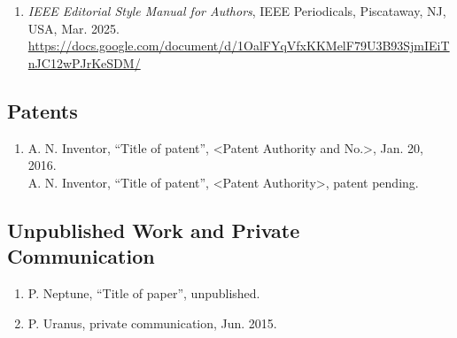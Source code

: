 \documentclass[%
               hyphens,       %
               ]{jacow}
\begin{document}
\begin{enumerate}[leftmargin=22pt, resume*]
	\item \textit{IEEE Editorial Style Manual for Authors},
		IEEE Periodicals, Piscataway,
		NJ, USA, Mar. 2025. \\
		\url{https://docs.google.com/document/d/1OalFYqVfxKKMelF79U3B93SjmIEiTnJC12wPJrKeSDM/}
\end{enumerate}

\subsection{Patents}

\begin{enumerate}[leftmargin=22pt, resume*]
	\item  A. N. Inventor, “Title of patent”, 
		<Patent Authority and No.>, Jan. 20, 2016. \\[3pt]
		A. N. Inventor, “Title of patent”, 
		<Patent Authority>, patent pending.

\end{enumerate}

\subsection{Unpublished Work and Private Communication}

\begin{enumerate}[leftmargin=22pt, resume*]
	\item P. Neptune, “Title of paper”, unpublished.
	
	\item P. Uranus, private communication, Jun. 2015.
\end{enumerate}

\newpage
%
%

\end{document}

